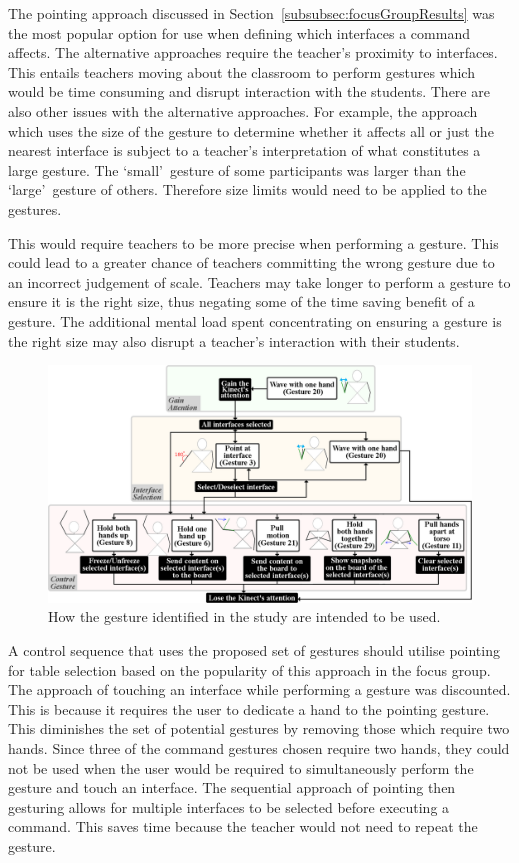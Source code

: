 \documentclass[link]{IWCOMP}
\begin{document}
The pointing approach discussed in Section~\ref{subsubsec:focusGroupResults} was the most popular option for use when defining which interfaces a command affects.
The alternative approaches require the teacher's proximity to interfaces.
This entails teachers moving about the classroom to perform gestures which would be time consuming and disrupt interaction with the students.
There are also other issues with the alternative approaches.
For example, the approach which uses the size of the gesture to determine whether it affects all or just the nearest interface is subject to a teacher's interpretation of what constitutes a large gesture.
The \lq small\rq\ gesture of some participants was larger than the \lq large\rq\ gesture of others.
Therefore size limits would need to be applied to the gestures.

This would require teachers to be more precise when performing a gesture.
This could lead to a greater chance of teachers committing the wrong gesture due to an incorrect judgement of scale.
Teachers may take longer to perform a gesture to ensure it is the right size, thus negating some of the time saving benefit of a gesture.
The additional mental load spent concentrating on ensuring a gesture is the right size may also disrupt a teacher's interaction with their students.

\begin{figure}[t]
   \centering
   \includegraphics[width=1\textwidth]{figures/control_flow.png}
   \caption{How the gesture identified in the study are intended to be used.}
   \label{fig:flow}
\end{figure}

A control sequence that uses the proposed set of gestures should utilise pointing for table selection based on the popularity of this approach in the focus group.
The approach of touching an interface while performing a gesture was discounted.  
This is because it requires the user to dedicate a hand to the pointing gesture.  
This diminishes the set of potential gestures by removing those which require two hands.
Since three of the command gestures chosen require two hands, they could not be used when the user would be required to simultaneously perform the gesture and touch an interface.
The sequential approach of pointing then gesturing allows for multiple interfaces to be selected before executing a command.
This saves time because the teacher would not need to repeat the gesture.
\end{document}
